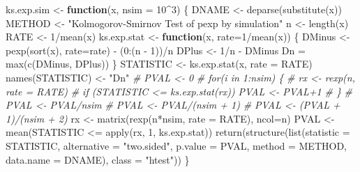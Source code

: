 \documentclass[
]{book}
\newenvironment{Shaded}{\begin{snugshade}}{\end{snugshade}}
\newcommand{\AttributeTok}[1]{\textcolor[rgb]{0.77,0.63,0.00}{#1}}
\newcommand{\CommentTok}[1]{\textcolor[rgb]{0.56,0.35,0.01}{\textit{#1}}}
\newcommand{\ControlFlowTok}[1]{\textcolor[rgb]{0.13,0.29,0.53}{\textbf{#1}}}
\newcommand{\DecValTok}[1]{\textcolor[rgb]{0.00,0.00,0.81}{#1}}
\newcommand{\FunctionTok}[1]{\textcolor[rgb]{0.00,0.00,0.00}{#1}}
\newcommand{\NormalTok}[1]{#1}
\newcommand{\OtherTok}[1]{\textcolor[rgb]{0.56,0.35,0.01}{#1}}
\newcommand{\SpecialCharTok}[1]{\textcolor[rgb]{0.00,0.00,0.00}{#1}}
\newcommand{\StringTok}[1]{\textcolor[rgb]{0.31,0.60,0.02}{#1}}
\theoremstyle{break}
\theoremstyle{definition}
\theoremstyle{definition}
\theoremstyle{definition}
\theoremstyle{definition}
\theoremstyle{remark}
\begin{document}
\begin{enumerate}
\begin{Shaded}
\begin{Highlighting}[]
\NormalTok{ks.exp.sim }\OtherTok{\textless{}{-}} \ControlFlowTok{function}\NormalTok{(x, }\AttributeTok{nsim =} \DecValTok{10}\SpecialCharTok{\^{}}\DecValTok{3}\NormalTok{) \{}
\NormalTok{  DNAME }\OtherTok{\textless{}{-}} \FunctionTok{deparse}\NormalTok{(}\FunctionTok{substitute}\NormalTok{(x))}
\NormalTok{  METHOD }\OtherTok{\textless{}{-}} \StringTok{"Kolmogorov{-}Smirnov Test of pexp by simulation"} 
\NormalTok{  n }\OtherTok{\textless{}{-}} \FunctionTok{length}\NormalTok{(x)}
\NormalTok{  RATE }\OtherTok{\textless{}{-}} \DecValTok{1}\SpecialCharTok{/}\FunctionTok{mean}\NormalTok{(x)}
\NormalTok{  ks.exp.stat }\OtherTok{\textless{}{-}} \ControlFlowTok{function}\NormalTok{(x, }\AttributeTok{rate=}\DecValTok{1}\SpecialCharTok{/}\FunctionTok{mean}\NormalTok{(x)) \{}
\NormalTok{    DMinus }\OtherTok{\textless{}{-}} \FunctionTok{pexp}\NormalTok{(}\FunctionTok{sort}\NormalTok{(x), }\AttributeTok{rate=}\NormalTok{rate) }\SpecialCharTok{{-}}\NormalTok{ (}\DecValTok{0}\SpecialCharTok{:}\NormalTok{(n }\SpecialCharTok{{-}} \DecValTok{1}\NormalTok{))}\SpecialCharTok{/}\NormalTok{n}
\NormalTok{    DPlus }\OtherTok{\textless{}{-}} \DecValTok{1}\SpecialCharTok{/}\NormalTok{n }\SpecialCharTok{{-}}\NormalTok{ DMinus}
\NormalTok{    Dn }\OtherTok{=} \FunctionTok{max}\NormalTok{(}\FunctionTok{c}\NormalTok{(DMinus, DPlus))}
\NormalTok{  \}  }
\NormalTok{  STATISTIC }\OtherTok{\textless{}{-}} \FunctionTok{ks.exp.stat}\NormalTok{(x, }\AttributeTok{rate =}\NormalTok{ RATE) }
  \FunctionTok{names}\NormalTok{(STATISTIC) }\OtherTok{\textless{}{-}} \StringTok{"Dn"}
  \CommentTok{\# PVAL \textless{}{-} 0}
  \CommentTok{\# for(i in 1:nsim) \{}
  \CommentTok{\#   rx \textless{}{-} rexp(n, rate = RATE)}
  \CommentTok{\#   if (STATISTIC \textless{}= ks.exp.stat(rx)) PVAL \textless{}{-} PVAL+1}
  \CommentTok{\# \}}
  \CommentTok{\# PVAL \textless{}{-} PVAL/nsim}
  \CommentTok{\# PVAL \textless{}{-} PVAL/(nsim + 1)}
  \CommentTok{\# PVAL \textless{}{-} (PVAL + 1)/(nsim + 2)}
\NormalTok{  rx }\OtherTok{\textless{}{-}} \FunctionTok{matrix}\NormalTok{(}\FunctionTok{rexp}\NormalTok{(n}\SpecialCharTok{*}\NormalTok{nsim, }\AttributeTok{rate =}\NormalTok{ RATE), }\AttributeTok{ncol=}\NormalTok{n)}
\NormalTok{  PVAL }\OtherTok{\textless{}{-}} \FunctionTok{mean}\NormalTok{(STATISTIC }\SpecialCharTok{\textless{}=} \FunctionTok{apply}\NormalTok{(rx, }\DecValTok{1}\NormalTok{, ks.exp.stat))}
  \FunctionTok{return}\NormalTok{(}\FunctionTok{structure}\NormalTok{(}\FunctionTok{list}\NormalTok{(}\AttributeTok{statistic =}\NormalTok{ STATISTIC, }\AttributeTok{alternative =} \StringTok{"two.sided"}\NormalTok{, }
                   \AttributeTok{p.value =}\NormalTok{ PVAL, }\AttributeTok{method =}\NormalTok{ METHOD, }\AttributeTok{data.name =}\NormalTok{ DNAME), }
                   \AttributeTok{class =} \StringTok{"htest"}\NormalTok{))}
\NormalTok{\}}
\end{Highlighting}
\end{Shaded}


\end{enumerate}
\end{document}
